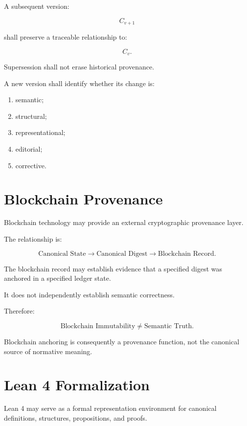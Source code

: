 \documentclass[11pt]{article}
\begin{document}
A subsequent version:

\[
C_{v+1}
\]

shall preserve a traceable relationship to:

\[
C_v.
\]

Supersession shall not erase historical provenance.

A new version shall identify whether its change is:

\begin{enumerate}
    \item semantic;
    \item structural;
    \item representational;
    \item editorial;
    \item corrective.
\end{enumerate}

\section{Blockchain Provenance}

Blockchain technology may provide an external cryptographic
provenance layer.

The relationship is:

\[
\boxed{
\text{Canonical State}
\rightarrow
\text{Canonical Digest}
\rightarrow
\text{Blockchain Record}.
}
\]

The blockchain record may establish evidence that a specified
digest was anchored in a specified ledger state.

It does not independently establish semantic correctness.

Therefore:

\[
\boxed{
\text{Blockchain Immutability}
\neq
\text{Semantic Truth}.
}
\]

Blockchain anchoring is consequently a provenance function, not
the canonical source of normative meaning.

\section{Lean 4 Formalization}

Lean 4 may serve as a formal representation environment for
canonical definitions, structures, propositions, and proofs.
\end{document}
